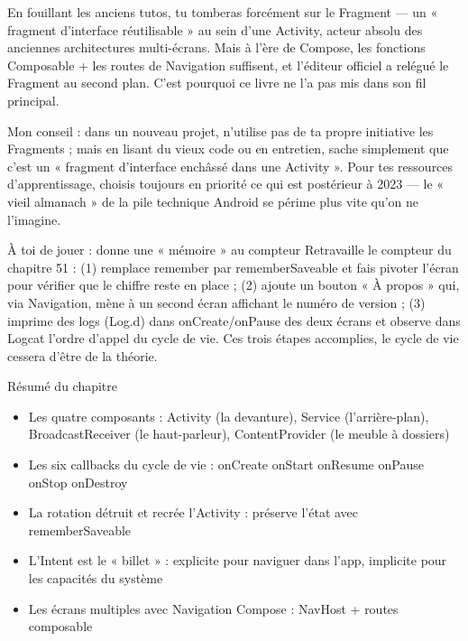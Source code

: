 
En fouillant les anciens tutos, tu tomberas forcément sur le Fragment — un « fragment d'interface réutilisable » au sein d'une Activity, acteur absolu des anciennes architectures multi-écrans. Mais à l'ère de Compose, les fonctions Composable + les routes de Navigation suffisent, et l'éditeur officiel a relégué le Fragment au second plan. C'est pourquoi ce livre ne l'a pas mis dans son fil principal.

Mon conseil : dans un nouveau projet, n'utilise pas de ta propre initiative les Fragments ; mais en lisant du vieux code ou en entretien, sache simplement que c'est un « fragment d'interface enchâssé dans une Activity ». Pour tes ressources d'apprentissage, choisis toujours en priorité ce qui est postérieur à 2023 — le « vieil almanach » de la pile technique Android se périme plus vite qu'on ne l'imagine.

\begin{tcbpractice}{À toi de jouer : donne une « mémoire » au compteur}
Retravaille le compteur du chapitre 51 : (1) remplace remember par rememberSaveable et fais pivoter l'écran pour vérifier que le chiffre reste en place ; (2) ajoute un bouton « À propos » qui, via Navigation, mène à un second écran affichant le numéro de version ; (3) imprime des logs (Log.d) dans onCreate/onPause des deux écrans et observe dans Logcat l'ordre d'appel du cycle de vie. Ces trois étapes accomplies, le cycle de vie cessera d'être de la théorie.

\end{tcbpractice}

\begin{tcbsummary}{Résumé du chapitre}
\begin{itemize}
  \item Les quatre composants : Activity (la devanture), Service (l'arrière-plan), BroadcastReceiver (le haut-parleur), ContentProvider (le meuble à dossiers)
  \item Les six callbacks du cycle de vie : onCreate onStart onResume onPause onStop onDestroy
  \item La rotation détruit et recrée l'Activity : préserve l'état avec rememberSaveable
  \item L'Intent est le « billet » : explicite pour naviguer dans l'app, implicite pour les capacités du système
  \item Les écrans multiples avec Navigation Compose : NavHost + routes composable
\end{itemize}

\end{tcbsummary}
